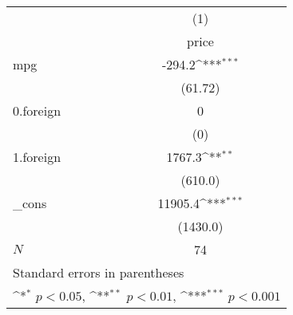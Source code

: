 {
\def\sym#1{\ifmmode^{#1}\else\(^{#1}\)\fi}
\begin{tabular}{l*{1}{c}}
\hline\hline
            &\multicolumn{1}{c}{(1)}\\
            &\multicolumn{1}{c}{price}\\
\hline
mpg         &      -294.2\sym{***}\\
            &     (61.72)         \\
[1em]
0.foreign   &           0         \\
            &         (0)         \\
[1em]
1.foreign   &      1767.3\sym{**} \\
            &     (610.0)         \\
[1em]
\_cons      &     11905.4\sym{***}\\
            &    (1430.0)         \\
\hline
\(N\)       &          74         \\
\hline\hline
\multicolumn{2}{l}{\footnotesize Standard errors in parentheses}\\
\multicolumn{2}{l}{\footnotesize \sym{*} \(p<0.05\), \sym{**} \(p<0.01\), \sym{***} \(p<0.001\)}\\
\end{tabular}
}
